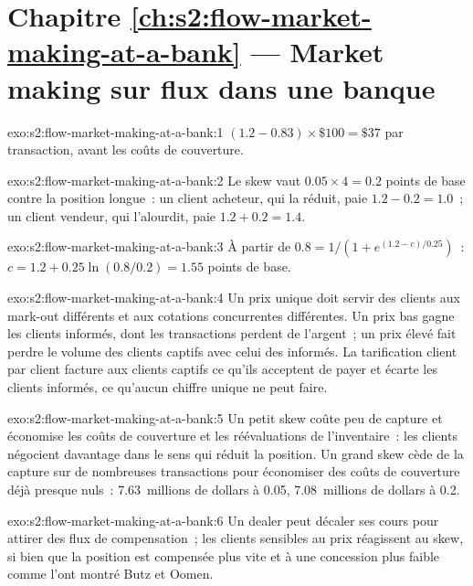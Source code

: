 \section*{Chapitre \ref{ch:s2:flow-market-making-at-a-bank} --- Market making sur flux dans une banque}

\begin{solution}{exo:s2:flow-market-making-at-a-bank:1}
$(1.2 - 0.83) \times \$100 = \$37$ par transaction, avant les coûts de couverture.
\end{solution}

\begin{solution}{exo:s2:flow-market-making-at-a-bank:2}
Le skew vaut $0.05 \times 4 = 0.2$ points de base contre la position longue~: un client acheteur, qui la réduit, paie $1.2 - 0.2 = 1.0$~; un client vendeur,
qui l'alourdit, paie $1.2 + 0.2 = 1.4$.
\end{solution}

\begin{solution}{exo:s2:flow-market-making-at-a-bank:3}
À partir de $0.8 = 1/(1 + e^{(1.2 - c)/0.25})$~: $c = 1.2 + 0.25 \ln(0.8/0.2) = 1.55$ points de base.
\end{solution}

\begin{solution}{exo:s2:flow-market-making-at-a-bank:4}
Un prix unique doit servir des clients aux mark-out différents et aux cotations concurrentes différentes. Un prix bas gagne les clients informés, dont les transactions perdent
de l'argent~; un prix élevé fait perdre le volume des clients captifs avec celui des informés. La tarification client par client facture aux clients captifs ce qu'ils acceptent de payer et écarte
les clients informés, ce qu'aucun chiffre unique ne peut faire.
\end{solution}

\begin{solution}{exo:s2:flow-market-making-at-a-bank:5}
Un petit skew coûte peu de capture et économise les coûts de couverture et les réévaluations de l'inventaire~: les clients négocient davantage dans le sens qui réduit la position. Un grand skew
cède de la capture sur de nombreuses transactions pour économiser des coûts de couverture déjà presque nuls~: 7.63~millions de dollars à 0.05, 7.08~millions de dollars à 0.2.
\end{solution}

\begin{solution}{exo:s2:flow-market-making-at-a-bank:6}
Un dealer peut décaler ses cours pour attirer des flux de compensation~; les clients sensibles au prix réagissent au skew, si bien que la position est compensée plus vite et à une concession plus faible
comme l'ont montré Butz et Oomen.
\end{solution}

